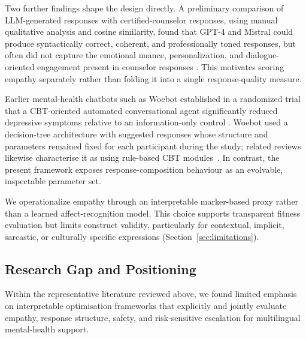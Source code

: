 \documentclass[mathematics,article,submit,xetex,moreauthors]{Definitions/mdpi}
\begin{document}
Two further findings shape the design directly. A preliminary comparison of
LLM-generated responses with certified-counselor responses, using manual
qualitative analysis and cosine similarity, found that GPT-4 and Mistral could
produce syntactically correct, coherent, and professionally toned responses,
but often did not capture the emotional nuance, personalization, and
dialogue-oriented engagement present in counselor responses
\cite{humanai2024}. This motivates scoring empathy separately rather than
folding it into a single response-quality measure.

Earlier mental-health chatbots such as Woebot established in a randomized trial
that a CBT-oriented automated conversational agent significantly reduced
depressive symptoms relative to an information-only control
\cite{woebot2017}. Woebot used a decision-tree architecture with suggested
responses whose structure and parameters remained fixed for each participant
during the study; related reviews likewise characterise it as using rule-based
CBT modules~\cite{ijca2025emotion}. In contrast, the present framework exposes
response-composition behaviour as an evolvable, inspectable parameter set.

We operationalize empathy through an interpretable marker-based proxy rather
than a learned affect-recognition model. This choice supports transparent
fitness evaluation but limits construct validity, particularly for contextual,
implicit, sarcastic, or culturally specific expressions
(Section~\ref{sec:limitations}).

\subsection{Research Gap and Positioning}

Within the representative literature reviewed above, we found limited emphasis
on interpretable optimisation frameworks that explicitly and jointly evaluate
empathy, response structure, safety, and risk-sensitive escalation for
multilingual mental-health support. 
\end{document}

